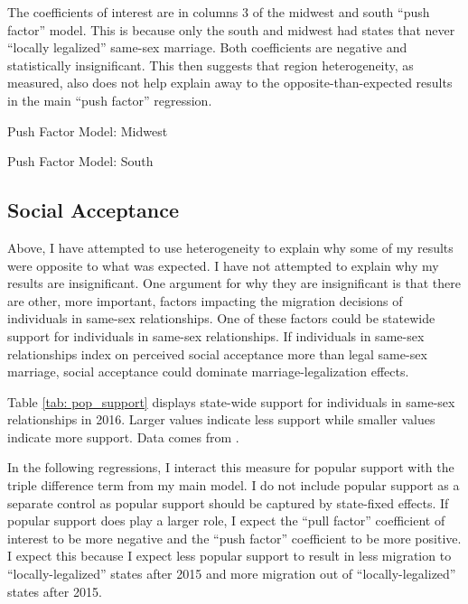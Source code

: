 \documentclass[12pt,letterpaper]{article}
\begin{document}
The coefficients of interest are in columns 3 of the midwest and south “push factor” model. This is because only the south and midwest had states that never “locally legalized” same-sex marriage. Both coefficients are negative and statistically insignificant. This then suggests that region heterogeneity, as measured, also does not help explain away to the opposite-than-expected results in the main “push factor” regression. 

\clearpage
\begin{table}[htbp] %
    \centering
    \caption{Push Factor Model: Midwest}
    \label{tab: midwest_exante_model}
    
\end{table}
\begin{table}[htbp]
    \centering
    \caption{Push Factor Model: South}
    \label{tab: south_exante_model}
    
\end{table}



\clearpage
\subsection{Social Acceptance}

Above, I have attempted to use heterogeneity to explain why some of my results were opposite to what was expected. I have not attempted to explain why my results are insignificant. One argument for why they are insignificant is that there are other, more important, factors impacting the migration decisions of individuals in same-sex relationships. One of these factors could be statewide support for individuals in same-sex relationships. If individuals in same-sex relationships index on perceived social acceptance more than legal same-sex marriage, social acceptance could dominate marriage-legalization effects.

Table \ref{tab: pop_support} displays state-wide support for individuals in same-sex relationships in 2016. Larger values indicate less support while smaller values indicate more support. Data comes from \citet{29}.



In the following regressions, I interact this measure for popular support with the triple difference term from my main model. I do not include popular support as a separate control as popular support should be captured by state-fixed effects. If popular support does play a larger role, I expect the “pull factor” coefficient of interest to be more negative and the “push factor” coefficient to be more positive. I expect this because I expect less popular support to result in less migration to “locally-legalized” states after 2015 and more migration out of “locally-legalized” states after 2015. 
\end{document}
